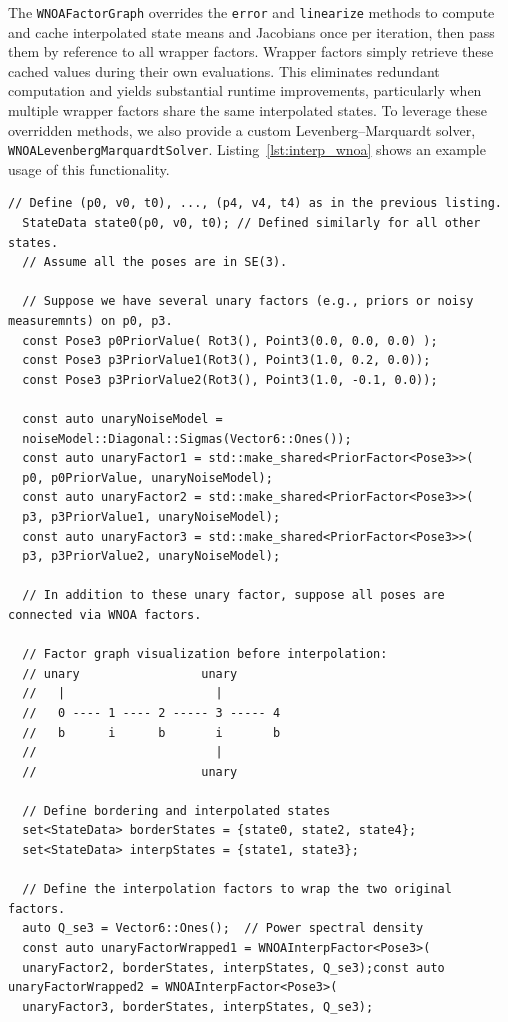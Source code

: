 The \texttt{WNOAFactorGraph} overrides the \texttt{error} and \texttt{linearize} methods to compute and cache interpolated state means and Jacobians once per iteration, then pass them by reference to all wrapper factors.
Wrapper factors simply retrieve these cached values during their own evaluations.
This eliminates redundant computation and yields substantial runtime improvements, particularly when multiple wrapper factors share the same interpolated states.
To leverage these overridden methods, we also provide a custom Levenberg–Marquardt solver, \texttt{WNOALevenbergMarquardtSolver}.
Listing~\ref{lst:interp_wnoa} shows an example usage of this functionality.

\begin{lstlisting}[style=C++Style, label={lst:interp_wnoa}, caption={Constructing an interpolated WNOA factor graph.}]
  // Define (p0, v0, t0), ..., (p4, v4, t4) as in the previous listing.
  StateData state0(p0, v0, t0); // Defined similarly for all other states.
  // Assume all the poses are in SE(3).
	
  // Suppose we have several unary factors (e.g., priors or noisy measuremnts) on p0, p3.
  const Pose3 p0PriorValue( Rot3(), Point3(0.0, 0.0, 0.0) );  
  const Pose3 p3PriorValue1(Rot3(), Point3(1.0, 0.2, 0.0));   
  const Pose3 p3PriorValue2(Rot3(), Point3(1.0, -0.1, 0.0));   
	
  const auto unaryNoiseModel = 
  noiseModel::Diagonal::Sigmas(Vector6::Ones());
  const auto unaryFactor1 = std::make_shared<PriorFactor<Pose3>>(
  p0, p0PriorValue, unaryNoiseModel);
  const auto unaryFactor2 = std::make_shared<PriorFactor<Pose3>>(
  p3, p3PriorValue1, unaryNoiseModel);
  const auto unaryFactor3 = std::make_shared<PriorFactor<Pose3>>(
  p3, p3PriorValue2, unaryNoiseModel);
	
  // In addition to these unary factor, suppose all poses are connected via WNOA factors.
	
  // Factor graph visualization before interpolation:
  // unary                 unary
  //   |                     |
  //   0 ---- 1 ---- 2 ----- 3 ----- 4
  //   b      i      b       i       b
  //                         |         
  //                       unary
	
  // Define bordering and interpolated states
  set<StateData> borderStates = {state0, state2, state4};
  set<StateData> interpStates = {state1, state3};
	
  // Define the interpolation factors to wrap the two original factors.
  auto Q_se3 = Vector6::Ones();  // Power spectral density
  const auto unaryFactorWrapped1 = WNOAInterpFactor<Pose3>(
  unaryFactor2, borderStates, interpStates, Q_se3);const auto unaryFactorWrapped2 = WNOAInterpFactor<Pose3>(
  unaryFactor3, borderStates, interpStates, Q_se3);
	

\end{lstlisting}
